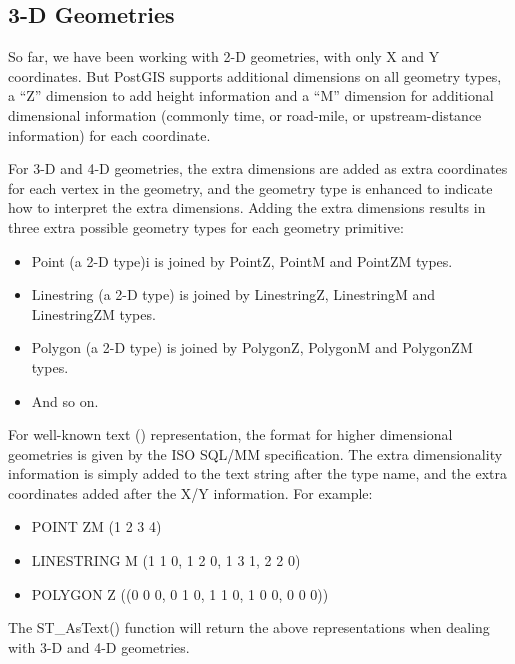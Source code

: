 \documentclass[a4paper,11pt,english]{sphinxmanual}
\begin{document}
\subsection{3-D Geometries}
\label{\detokenize{advanced:d-geometries}}
So far, we have been working with 2-D geometries, with only X and Y coordinates. But PostGIS supports additional dimensions on all geometry types, a “Z” dimension to add height information and a “M” dimension for additional dimensional information (commonly time, or road-mile, or upstream-distance information) for each coordinate.

For 3-D and 4-D geometries, the extra dimensions are added as extra coordinates for each vertex in the geometry, and the geometry type is enhanced to indicate how to interpret the extra dimensions. Adding the extra dimensions results in three extra possible geometry types for each geometry primitive:
\begin{itemize}
\item {} 
Point (a 2-D type)i is joined by PointZ, PointM and PointZM types.

\item {} 
Linestring (a 2-D type) is joined by LinestringZ, LinestringM and LinestringZM types.

\item {} 
Polygon (a 2-D type) is joined by PolygonZ, PolygonM and PolygonZM types.

\item {} 
And so on.

\end{itemize}

For well-known text ({\hyperref[\detokenize{glossary:term-wkt}]{}}) representation, the format for higher dimensional geometries is given by the ISO SQL/MM specification. The extra dimensionality information is simply added to the text string after the type name, and the extra coordinates added after the X/Y information. For example:
\begin{itemize}
\item {} 
POINT ZM (1 2 3 4)

\item {} 
LINESTRING M (1 1 0, 1 2 0, 1 3 1, 2 2 0)

\item {} 
POLYGON Z ((0 0 0, 0 1 0, 1 1 0, 1 0 0, 0 0 0))

\end{itemize}

The ST\_AsText() function will return the above representations when dealing with 3-D and 4-D geometries.
\end{document}

